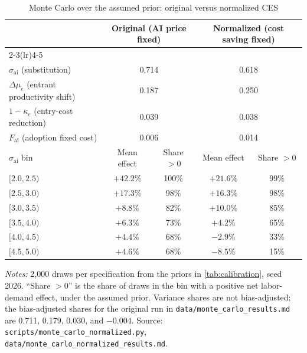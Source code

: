 \begin{table}[t]
  \centering
  \caption{Monte Carlo over the assumed prior: original versus normalized CES}
  \label{tab:mc-normalized}
  \small
  \begin{tabular}{lcccc}
    \toprule
    & \multicolumn{2}{c}{Original (AI price fixed)} & \multicolumn{2}{c}{Normalized (cost saving fixed)} \\
    \cmidrule(lr){2-3}\cmidrule(lr){4-5}
    \multicolumn{5}{l}{\textit{First-order variance share of the net labor-demand effect}} \\
    $\sigma_{\text{ai}}$ (substitution) & \multicolumn{2}{c}{0.714} & \multicolumn{2}{c}{0.618} \\
    $\Delta\mu_e$ (entrant productivity shift) & \multicolumn{2}{c}{0.187} & \multicolumn{2}{c}{0.250} \\
    $1-\kappa_e$ (entry-cost reduction) & \multicolumn{2}{c}{0.039} & \multicolumn{2}{c}{0.038} \\
    $F_{\text{ai}}$ (adoption fixed cost) & \multicolumn{2}{c}{0.006} & \multicolumn{2}{c}{0.014} \\
    \midrule
    $\sigma_{\text{ai}}$ bin & Mean effect & Share $> 0$ & Mean effect & Share $> 0$ \\
    \midrule
    $[2.0, 2.5)$ & $+42.2\%$ & 100\% & $+21.6\%$ & 99\% \\
    $[2.5, 3.0)$ & $+17.3\%$ & 98\% & $+16.3\%$ & 98\% \\
    $[3.0, 3.5)$ & $+8.8\%$ & 82\% & $+10.0\%$ & 85\% \\
    $[3.5, 4.0)$ & $+6.3\%$ & 73\% & $+4.2\%$ & 65\% \\
    $[4.0, 4.5)$ & $+4.4\%$ & 68\% & $-2.9\%$ & 33\% \\
    $[4.5, 5.0)$ & $+4.6\%$ & 68\% & $-8.5\%$ & 15\% \\
    \bottomrule
  \end{tabular}
  \par\smallskip
  \parbox{\linewidth}{\footnotesize \textit{Notes:} 2,000 draws per specification from the priors in \cref{tab:calibration}, seed 2026. ``Share $> 0$'' is the share of draws in the bin with a positive net labor-demand effect, under the assumed prior. Variance shares are not bias-adjusted; the bias-adjusted shares for the original run in \texttt{data/monte\_carlo\_results.md} are 0.711, 0.179, 0.030, and $-0.004$. Source: \texttt{scripts/monte\_carlo\_normalized.py}, \texttt{data/monte\_carlo\_normalized\_results.md}.}
\end{table}

